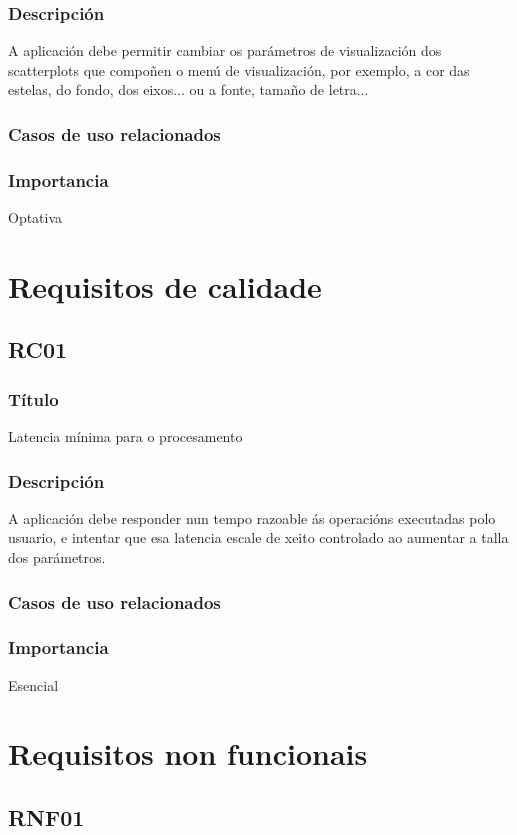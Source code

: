 \subsubsection{Descripción}
A aplicación debe permitir cambiar os parámetros de visualización dos scatterplots que compoñen o menú de visualización, por exemplo, a cor das estelas, do fondo, dos eixos... ou a fonte, tamaño de letra...
\subsubsection{Casos de uso relacionados}
\subsubsection{Importancia}
Optativa

\section{Requisitos de calidade}

\subsection{RC01}
\subsubsection{Título}
Latencia mínima para o procesamento
\subsubsection{Descripción}
A aplicación debe responder nun tempo razoable ás operacións executadas polo usuario, e intentar que esa latencia escale de xeito controlado ao aumentar a talla dos parámetros.
\subsubsection{Casos de uso relacionados}
\subsubsection{Importancia}
Esencial

\section{Requisitos non funcionais}

\subsection{RNF01}
